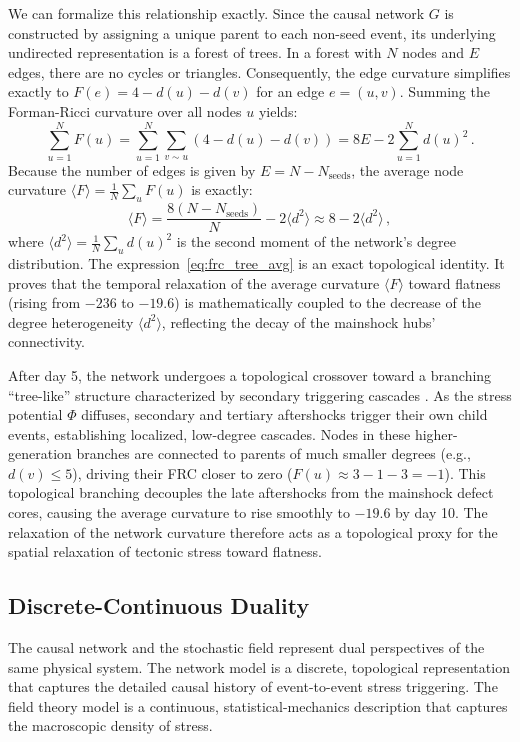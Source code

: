 \documentclass[twocolumn,amsmath,amssymb,aps,pre,superscriptaddress]{revtex4-1}
\begin{document}
We can formalize this relationship exactly. Since the causal network $G$ is constructed by assigning a unique parent to each non-seed event, its underlying undirected representation is a forest of trees. In a forest with $N$ nodes and $E$ edges, there are no cycles or triangles. Consequently, the edge curvature simplifies exactly to $F(e) = 4 - d(u) - d(v)$ for an edge $e = (u,v)$. Summing the Forman-Ricci curvature over all nodes $u$ yields:
\begin{equation}
\sum_{u=1}^N F(u) = \sum_{u=1}^N \sum_{v \sim u} (4 - d(u) - d(v)) = 8E - 2 \sum_{u=1}^N d(u)^2 \,.
\label{eq:frc_tree_identity}
\end{equation}
Because the number of edges is given by $E = N - N_{\text{seeds}}$, the average node curvature $\langle F \rangle = \frac{1}{N} \sum_u F(u)$ is exactly:
\begin{equation}
\langle F \rangle = \frac{8(N-N_{\text{seeds}})}{N} - 2 \langle d^2 \rangle \approx 8 - 2 \langle d^2 \rangle \,,
\label{eq:frc_tree_avg}
\end{equation}
where $\langle d^2 \rangle = \frac{1}{N}\sum_u d(u)^2$ is the second moment of the network's degree distribution. The expression~\eqref{eq:frc_tree_avg} is an exact topological identity. It proves that the temporal relaxation of the average curvature $\langle F \rangle$ toward flatness (rising from $-236$ to $-19.6$) is mathematically coupled to the decrease of the degree heterogeneity $\langle d^2 \rangle$, reflecting the decay of the mainshock hubs' connectivity.

After day 5, the network undergoes a topological crossover toward a branching ``tree-like'' structure characterized by secondary triggering cascades \cite{saichev2005power}. As the stress potential $\Phi$ diffuses, secondary and tertiary aftershocks trigger their own child events, establishing localized, low-degree cascades. Nodes in these higher-generation branches are connected to parents of much smaller degrees (e.g., $d(v) \le 5$), driving their FRC closer to zero ($F(u) \approx 3 - 1 - 3 = -1$). This topological branching decouples the late aftershocks from the mainshock defect cores, causing the average curvature to rise smoothly to $-19.6$ by day 10. The relaxation of the network curvature therefore acts as a topological proxy for the spatial relaxation of tectonic stress toward flatness.

\subsection{Discrete-Continuous Duality}
The causal network and the stochastic field represent dual perspectives of the same physical system. The network model is a discrete, topological representation that captures the detailed causal history of event-to-event stress triggering. The field theory model is a continuous, statistical-mechanics description that captures the macroscopic density of stress. 
\end{document}
